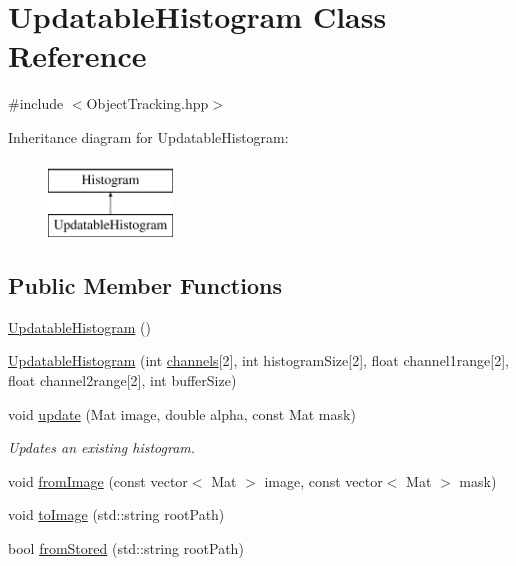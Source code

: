 \hypertarget{classUpdatableHistogram}{\section{\-Updatable\-Histogram \-Class \-Reference}
\label{classUpdatableHistogram}
}


{\ttfamily \#include $<$\-Object\-Tracking.\-hpp$>$}

\-Inheritance diagram for \-Updatable\-Histogram\-:\begin{figure}[H]
\begin{center}
\leavevmode
\includegraphics[height=2.000000cm]{classUpdatableHistogram}
\end{center}
\end{figure}
\subsection*{\-Public \-Member \-Functions}
\begin{DoxyCompactItemize}
\item 
\hyperlink{classUpdatableHistogram_a15fc0d1ffe1457090ec3590698cd580f}{\-Updatable\-Histogram} ()
\item 
\hyperlink{classUpdatableHistogram_a3bb23bc331d69dacc0a5d1e8544e4fd3}{\-Updatable\-Histogram} (int \hyperlink{classHistogram_a2143ce56ddacb3295a8aa0e3ac8d06f7}{channels}\mbox{[}2\mbox{]}, int histogram\-Size\mbox{[}2\mbox{]}, float channel1range\mbox{[}2\mbox{]}, float channel2range\mbox{[}2\mbox{]}, int buffer\-Size)
\item 
void \hyperlink{classUpdatableHistogram_aa3911bc41c2bcf4962814a42c92dc328}{update} (\-Mat image, double alpha, const \-Mat mask)
\begin{DoxyCompactList}\small\item\em \-Updates an existing histogram. \end{DoxyCompactList}\item 
void \hyperlink{classUpdatableHistogram_a79f6625306a30dbbc7a2f39b1596ed56}{from\-Image} (const vector$<$ \-Mat $>$ image, const vector$<$ \-Mat $>$ mask)
\item 
void \hyperlink{classUpdatableHistogram_a09f0f888514fa7d46297d41747f0e441}{to\-Image} (std\-::string root\-Path)
\item 
bool \hyperlink{classUpdatableHistogram_ab454a2e9aa450cd0869fc52fdf441a1d}{from\-Stored} (std\-::string root\-Path)
\end{DoxyCompactItemize}
